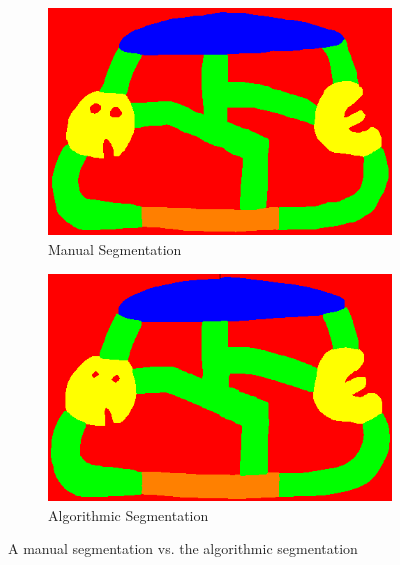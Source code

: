 \documentclass{IEEEtran}
\begin{document}
\begin{figure}[h]
     \centering
     \begin{subfigure}[b]{0.23\textwidth}
         \centering
         \includegraphics[width=\textwidth]{manualseg}
         \caption{Manual Segmentation}
         \label{fig:manualseg}
     \end{subfigure}
     \hfill
     \begin{subfigure}[b]{0.23\textwidth}
         \centering
         \includegraphics[width=\textwidth]{outputseg}
         \caption{Algorithmic Segmentation}
         \label{fig:outputseg}
     \end{subfigure}
        \caption{A manual segmentation vs. the algorithmic segmentation}
        \label{fig:segtest}
\end{figure}



\end{document}
